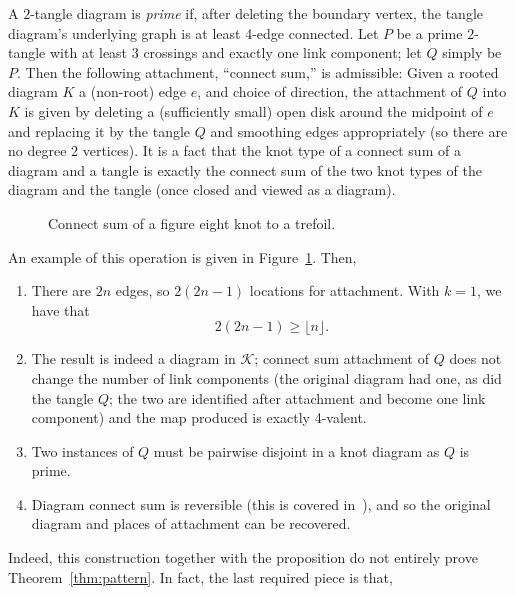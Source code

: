 \documentclass[submission%
]{dmtcs}
\newcommand{\KnotDiaClass}{\mathscr{K}}
\begin{document}
A $2$-tangle diagram is \emph{prime} if, after deleting the boundary
vertex, the tangle diagram's underlying graph is at least 4-edge
connected. Let $P$ be a prime $2$-tangle with at least $3$
crossings and exactly one link component; let $Q$ simply be $P$. Then the following
attachment, ``connect sum,'' is admissible: Given a rooted diagram $K$
a (non-root) edge $e$, and choice of direction, the attachment of $Q$
into $K$ is given by deleting a (sufficiently small) open disk around
the midpoint of $e$ and replacing it by the tangle $Q$ and smoothing
edges appropriately (so there are no degree 2 vertices). It is a fact
that the knot type of a connect sum of a diagram and a tangle is
exactly the connect sum of the two knot types of the diagram and the
tangle (once closed and viewed as a diagram).
\begin{figure}[hbtp]
  \centering
  \hfil
  \hfil
  \caption{Connect sum of a figure eight knot to a trefoil.}
  \label{fig:csexample}
\end{figure}
An example of
this operation is given in Figure~\ref{fig:csexample}. Then,
\begin{enumerate}
\item There are $2n$ edges, so $2(2n-1)$ locations for
  attachment. With $k = 1$, we have that
  \begin{displaymath}
    2(2n-1) \ge \lfloor n \rfloor.
  \end{displaymath}
\item The result is indeed a diagram in $\KnotDiaClass$; connect sum
  attachment of $Q$ does not change the number of link components (the
  original diagram had one, as did the tangle $Q$; the two are
  identified after attachment and become one link component) and the
  map produced is exactly 4-valent.
\item Two instances of $Q$ must be pairwise disjoint in a knot diagram
  as $Q$ is prime.
\item Diagram connect sum is reversible (this is covered
  in~\cite{CCMknotdiagrams2015}), and so the original diagram and
  places of attachment can be recovered.
\end{enumerate}

Indeed, this construction together with the proposition do not
entirely prove Theorem~\ref{thm:pattern}. In fact, the last required
piece is that,
\end{document}
